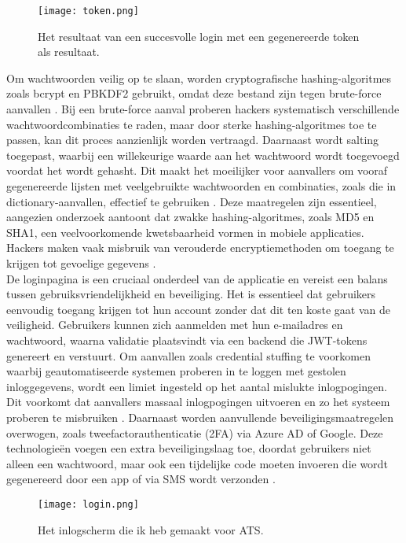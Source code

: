\begin{figure}
    \centering
    \texttt{[image: token.png]}
    \caption[Token]{Het resultaat van een succesvolle login met een gegenereerde token als resultaat.}
\end{figure}

Om wachtwoorden veilig op te slaan, worden cryptografische hashing-algoritmes zoals bcrypt en PBKDF2 gebruikt, omdat deze bestand zijn tegen brute-force aanvallen \autocite{Gupta2022}. Bij een brute-force aanval proberen hackers systematisch verschillende wachtwoordcombinaties te raden, maar door sterke hashing-algoritmes toe te passen, kan dit proces aanzienlijk worden vertraagd.
Daarnaast wordt salting toegepast, waarbij een willekeurige waarde aan het wachtwoord wordt toegevoegd voordat het wordt gehasht. Dit maakt het moeilijker voor aanvallers om vooraf gegenereerde lijsten met veelgebruikte wachtwoorden en combinaties, zoals die in dictionary-aanvallen, effectief te gebruiken \autocite{Arias2025}.
Deze maatregelen zijn essentieel, aangezien onderzoek aantoont dat zwakke hashing-algoritmes, zoals MD5 en SHA1, een veelvoorkomende kwetsbaarheid vormen in mobiele applicaties. Hackers maken vaak misbruik van verouderde encryptiemethoden om toegang te krijgen tot gevoelige gegevens \autocite{ReesCarter2024}. \\

De loginpagina is een cruciaal onderdeel van de applicatie en vereist een balans tussen gebruiksvriendelijkheid en beveiliging. Het is essentieel dat gebruikers eenvoudig toegang krijgen tot hun account zonder dat dit ten koste gaat van de veiligheid. Gebruikers kunnen zich aanmelden met hun e-mailadres en wachtwoord, waarna validatie plaatsvindt via een backend die JWT-tokens genereert en verstuurt.
Om aanvallen zoals credential stuffing te voorkomen waarbij geautomatiseerde systemen proberen in te loggen met gestolen inloggegevens, wordt een limiet ingesteld op het aantal mislukte inlogpogingen. Dit voorkomt dat aanvallers massaal inlogpogingen uitvoeren en zo het systeem proberen te misbruiken \autocite{Chinnasamy2025}.
Daarnaast worden aanvullende beveiligingsmaatregelen overwogen, zoals tweefactorauthenticatie (2FA) via Azure AD of Google. Deze technologieën voegen een extra beveiligingslaag toe, doordat gebruikers niet alleen een wachtwoord, maar ook een tijdelijke code moeten invoeren die wordt gegenereerd door een app of via SMS wordt verzonden \autocite{Jurisons2024}.

\begin{figure}
    \centering
    \texttt{[image: login.png]}
    \caption[Token]{Het inlogscherm die ik heb gemaakt voor ATS.}
\end{figure}

